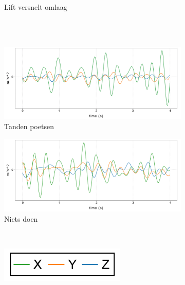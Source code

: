 \documentclass{article}
\begin{document}
\begin{figure}[h!]
\begin{subfigure}[b]{.49\linewidth}
    \caption{Lift versnelt omlaag}\label{fig:1h}
  \end{subfigure} \\~\\
  \begin{subfigure}[b]{.49\linewidth}
    \centering
    \includegraphics[width=.70\textwidth]{figures/tandenpoetsen}
    \caption{Tanden poetsen}\label{fig:1i}
  \end{subfigure}
  \begin{subfigure}[b]{.49\linewidth}
    \centering
    \includegraphics[width=.70\textwidth]{figures/nietsdoen}
    \caption{Niets doen}\label{fig:1j}
  \end{subfigure} \\
  \begin{subfigure}[b]{.49\linewidth}
    \centering
    \includegraphics[width=.25\textwidth]{figures/legend}
  \end{subfigure}
  
  \label{fig:8}
  
\end{figure}
\end{document}
